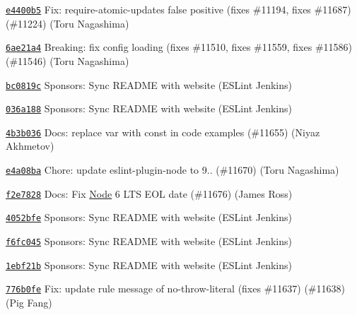 \begin{DoxyItemize}
\item \href{https://github.com/eslint/eslint/commit/e4400b5a02602bba7f67ea4cb874c231903c546a}{\texttt{ {\ttfamily e4400b5}}} Fix\+: require-\/atomic-\/updates false positive (fixes \#11194, fixes \#11687) (\#11224) (Toru Nagashima)
\item \href{https://github.com/eslint/eslint/commit/6ae21a4bfe5a1566f787fbad798182a524b96d28}{\texttt{ {\ttfamily 6ae21a4}}} Breaking\+: fix config loading (fixes \#11510, fixes \#11559, fixes \#11586) (\#11546) (Toru Nagashima)
\item \href{https://github.com/eslint/eslint/commit/bc0819c94aad14f7fad3cbc2338ea15658b0f272}{\texttt{ {\ttfamily bc0819c}}} Sponsors\+: Sync R\+E\+A\+D\+ME with website (E\+S\+Lint Jenkins)
\item \href{https://github.com/eslint/eslint/commit/036a188143677384f720ff18071fc4206c54500b}{\texttt{ {\ttfamily 036a188}}} Sponsors\+: Sync R\+E\+A\+D\+ME with website (E\+S\+Lint Jenkins)
\item \href{https://github.com/eslint/eslint/commit/4b3b036d6240cdbc2d52e670de36b1117f5f34d7}{\texttt{ {\ttfamily 4b3b036}}} Docs\+: replace {\ttfamily var} with {\ttfamily const} in code examples (\#11655) (Niyaz Akhmetov)
\item \href{https://github.com/eslint/eslint/commit/e4a08bae82788136b6899262cb8b9ed4fe7964e6}{\texttt{ {\ttfamily e4a08ba}}} Chore\+: update eslint-\/plugin-\/node to 9.. (\#11670) (Toru Nagashima)
\item \href{https://github.com/eslint/eslint/commit/f2e78281d057f38b18cc160e81ed1bb54a5b9565}{\texttt{ {\ttfamily f2e7828}}} Docs\+: Fix \mbox{\hyperlink{class_node}{Node}} 6 L\+TS E\+OL date (\#11676) (James Ross)
\item \href{https://github.com/eslint/eslint/commit/4052bfebb87850b901f2eb8687edfbe49c01d68f}{\texttt{ {\ttfamily 4052bfe}}} Sponsors\+: Sync R\+E\+A\+D\+ME with website (E\+S\+Lint Jenkins)
\item \href{https://github.com/eslint/eslint/commit/f6fc0450e749707bed44118c1205fb4e73e65628}{\texttt{ {\ttfamily f6fc045}}} Sponsors\+: Sync R\+E\+A\+D\+ME with website (E\+S\+Lint Jenkins)
\item \href{https://github.com/eslint/eslint/commit/1ebf21bc18769956366110bb62ff677639e633ae}{\texttt{ {\ttfamily 1ebf21b}}} Sponsors\+: Sync R\+E\+A\+D\+ME with website (E\+S\+Lint Jenkins)
\item \href{https://github.com/eslint/eslint/commit/776b0fe3d93da958517ac7752682091f22eb30b4}{\texttt{ {\ttfamily 776b0fe}}} Fix\+: update rule message of no-\/throw-\/literal (fixes \#11637) (\#11638) (Pig Fang)

\end{DoxyItemize}

